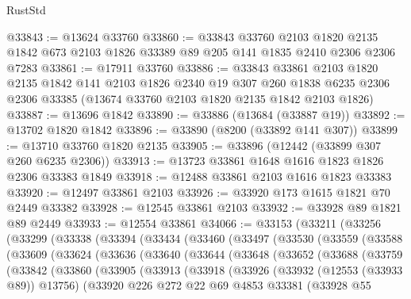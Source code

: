 \begin{lexlean}{RustStd}
\begin{coremodule}
@33843 := @13624 @33760
@33860 := @33843
    @33760
    @2103
    @1820
    @2135
    @1842
    @673
    @2103
    @1826
    @33389
    @89
    @205
    @141
    @1835
    @2410
    @2306
    @2306
    @7283
@33861 := @17911 @33760
@33886 := @33843
    @33861
    @2103
    @1820
    @2135
    @1842
    @141
    @2103
    @1826
    @2340
    @19
    @307
    @260
    @1838
    @6235
    @2306
    @2306
    @33385
    (@13674 @33760 @2103 @1820 @2135 @1842 @2103 @1826)
@33887 := @13696 @1842
@33890 := @33886 (@13684 (@33887 @19))
@33892 := @13702 @1820 @1842
@33896 := @33890 (@8200 (@33892 @141 @307))
@33899 := @13710 @33760 @1820 @2135
@33905 := @33896 (@12442 (@33899 @307 @260 @6235 @2306))
@33913 := @13723 @33861 @1648 @1616 @1823 @1826 @2306 @33383 @1849
@33918 := @12488 @33861 @2103 @1616 @1823 @33383
@33920 := @12497 @33861 @2103
@33926 := @33920 @173 @1615 @1821 @70 @2449 @33382
@33928 := @12545 @33861 @2103
@33932 := @33928 @89 @1821 @89 @2449
@33933 := @12554 @33861
@34066 := @33153
    (@33211
      (@33256
        (@33299
          (@33338
            (@33394
              (@33434
                (@33460
                  (@33497
                    (@33530
                      (@33559
                        (@33588
                          (@33609
                            (@33624
                              (@33636
                                (@33640
                                  (@33644
                                    (@33648
                                      (@33652
                                        (@33688
                                          (@33759
                                            (@33842
                                              (@33860
                                                (@33905
                                                  (@33913
                                                    (@33918
                                                      (@33926
                                                        (@33932 (@12553 (@33933 @89)) @13756)
                                                        (@33920
                                                          @226
                                                          @272
                                                          @22
                                                          @69
                                                          @4853
                                                          @33381
                                                          (@33928
                                                            @55

\end{coremodule}
\end{lexlean}
